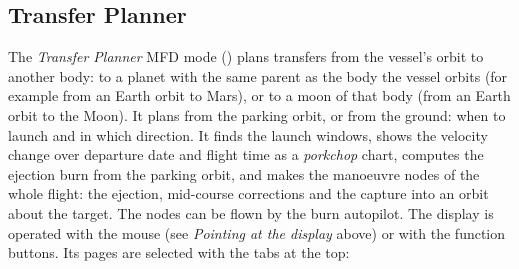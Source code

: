\documentclass[Orbiter User Manual.tex]{subfiles}
\begin{document}
\subsection{Transfer Planner}
\label{ssec:mfd_planner}
The \textit{Transfer Planner} MFD mode (\Shift{}) plans transfers from the vessel's orbit to another body: to a planet with the same parent as the body the vessel orbits (for example from an Earth orbit to Mars), or to a moon of that body (from an Earth orbit to the Moon). It plans from the parking orbit, or from the ground: when to launch and in which direction. It finds the launch windows, shows the velocity change over departure date and flight time as a \textit{porkchop} chart, computes the ejection burn from the parking orbit, and makes the manoeuvre nodes of the whole flight: the ejection, mid-course corrections and the capture into an orbit about the target. The nodes can be flown by the burn autopilot. The display is operated with the mouse (see \textit{Pointing at the display} above) or with the function buttons. Its pages are selected with the tabs at the top:
\end{document}
